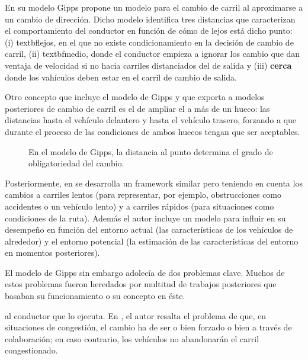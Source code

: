 En su modelo Gipps propone un modelo para el cambio de carril al aproximarse a un cambio de dirección. Dicho modelo identifica tres distancias que caracterizan el comportamiento del conductor en función de cómo de lejos está dicho punto: (i) textbf{lejos}, en el que no existe condicionamiento en la decisión de cambio de carril, (ii) textbf{medio}, donde el conductor empieza a ignorar los cambio que dan ventaja de velocidad si no hacia carriles distanciados del de salida y (iii) \textbf{cerca} donde los vahículos deben estar en el carril de cambio de salida.

Otro concepto que incluye el modelo de Gipps y que exporta a modelos posteriores de cambio de carril es el de ampliar el \textit{} a más de un hueco: las distancias hasta el vehículo delantero y hasta el vehículo trasero, forzando a que durante el proceso de  las condiciones de ambos huecos tengan que ser aceptables.

\begin{figure}
	\caption{En el modelo de Gipps, la distancia al punto determina el grado de obligatoriedad del cambio.}
	\label{fig:lane-change-type-depending-on-the-distance}
\end{figure}

Posteriormente, en \cite{wiedemann1992microscopic} se desarrolla un framework similar pero teniendo en cuenta los cambios a carriles lentos (para representar, por ejemplo, obstrucciones como accidentes o un vehículo lento) y a carriles rápidos (para situaciones como condiciones de la ruta). Además el autor incluye un modelo para influir en su desempeño en función del entorno actual (las características de los vehículos de alrededor) y el entorno potencial (la estimación de las características del entorno en momentos posteriores).

El modelo de Gipps sin embargo adolecía de dos problemas clave. Muchos de estos problemas fueron heredados por multitud de trabajos posteriores que basaban su funcionamiento o su concepto en éste.

 al conductor que lo ejecuta. En \cite{Hidas2002}, el autor resalta el problema de que, en situaciones de congestión, el cambio ha de ser o bien forzado o bien a través de colaboración; en caso contrario, los vehículos no abandonarán el carril congestionado.

